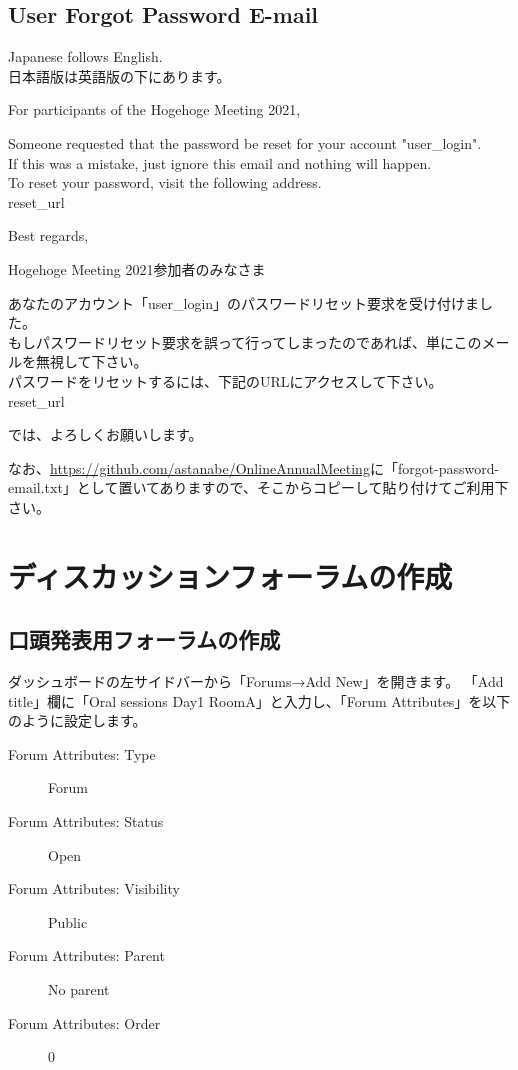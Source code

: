 \documentclass[titlepage,10pt,a4paper,uplatex]{jsbook}
\newenvironment{content}{\begin{shaded}\vspace{-1em}\raggedright\ttfamily\footnotesize\setlength{\baselineskip}{1.4em}}{\end{shaded}\vspace{-1em}}
\begin{document}
\subsection{User Forgot Password E-mail}

\begin{content}
Japanese follows English.\\
日本語版は英語版の下にあります。

For participants of the Hogehoge Meeting 2021,

Someone requested that the password be reset for your account "{\lbrack}user\_login{\rbrack}".\\
If this was a mistake, just ignore this email and nothing will happen.\\
To reset your password, visit the following address.\\
{\lbrack}reset\_url{\rbrack}

Best regards,

Hogehoge Meeting 2021参加者のみなさま

あなたのアカウント「{\lbrack}user\_login{\rbrack}」のパスワードリセット要求を受け付けました。\\
もしパスワードリセット要求を誤って行ってしまったのであれば、単にこのメールを無視して下さい。\\
パスワードをリセットするには、下記のURLにアクセスして下さい。\\
{\lbrack}reset\_url{\rbrack}

では、よろしくお願いします。
\end{content}

なお、\url{https://github.com/astanabe/OnlineAnnualMeeting}に「forgot-password-email.txt」として置いてありますので、そこからコピーして貼り付けてご利用下さい。

\section{ディスカッションフォーラムの作成}

\subsection{口頭発表用フォーラムの作成}

ダッシュボードの左サイドバーから「Forums→Add New」を開きます。
「Add title」欄に「Oral sessions Day1 RoomA」と入力し、「Forum Attributes」を以下のように設定します。

\begin{description}
\item[Forum Attributes: Type] Forum
\item[Forum Attributes: Status] Open
\item[Forum Attributes: Visibility] Public
\item[Forum Attributes: Parent] No parent
\item[Forum Attributes: Order] 0
\end{description}
\end{document}
